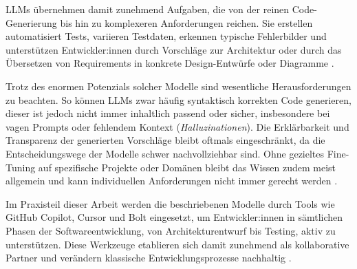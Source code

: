 LLMs übernehmen damit zunehmend Aufgaben, die von der reinen Code-Generierung
bis hin zu komplexeren Anforderungen reichen. Sie erstellen automatisiert
Tests, variieren Testdaten, erkennen typische Fehlerbilder und unterstützen
Entwickler:innen durch Vorschläge zur Architektur oder durch das Übersetzen von
Requirements in konkrete Design-Entwürfe oder Diagramme
\cite{esposito_generative_2025, nguyen-duc_generative_2023}.

Trotz des enormen Potenzials solcher Modelle sind wesentliche Herausforderungen
zu beachten. So können LLMs zwar häufig syntaktisch korrekten Code generieren,
dieser ist jedoch nicht immer inhaltlich passend oder sicher, insbesondere bei
vagen Prompts oder fehlendem Kontext (\textit{Halluzinationen}). Die
Erklärbarkeit und Transparenz der generierten Vorschläge bleibt oftmals
eingeschränkt, da die Entscheidungswege der Modelle schwer nachvollziehbar
sind. Ohne gezieltes Fine-Tuning auf spezifische Projekte oder Domänen bleibt
das Wissen zudem meist allgemein und kann individuellen Anforderungen nicht
immer gerecht werden \cite{esposito_generative_2025,
    nguyen-duc_generative_2023, donvir_role_2024}.

Im Praxisteil dieser Arbeit werden die beschriebenen Modelle durch Tools wie
GitHub Copilot, Cursor und Bolt eingesetzt, um Entwickler:innen in sämtlichen
Phasen der Softwareentwicklung, von Architekturentwurf bis Testing, aktiv zu
unterstützen. Diese Werkzeuge etablieren sich damit zunehmend als kollaborative
Partner und verändern klassische Entwicklungsprozesse nachhaltig
\cite{esposito_generative_2025, nguyen-duc_generative_2023}.

